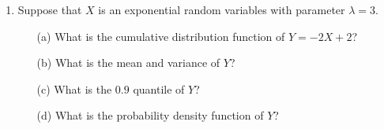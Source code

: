 \documentclass{article}    %
\begin{document}
\begin{enumerate}
\item Suppose that $ X $ is an exponential random variables with parameter $ \lambda = 3 $. 
\begin{enumerate}
	\item[(a)] What is the cumulative distribution function of $ Y=-2X + 2$? \\
	\item[(b)] What is the mean and variance of $ Y $?\\
	\item[(c)] What is the $ 0.9 $ quantile of $ Y $? \\
	\item[(d)] What is the probability density function of $ Y $?\\
	
\end{enumerate}
\end{enumerate}
\end{document}

